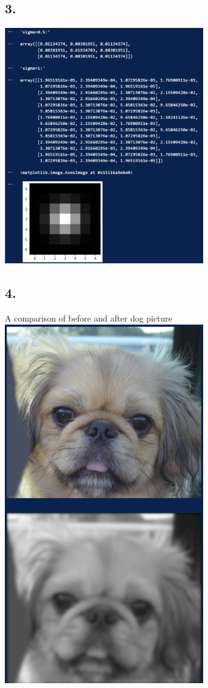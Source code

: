 \documentclass[12pt]{article}
\begin{document}
\subsection*{3.}
\includegraphics[width=0.65\textwidth]{imgs/3-1.png}
\subsection*{4.}
A comparison of before and after dog picture\\
\includegraphics[width=0.65\textwidth]{imgs/4-d.png}
\end{document}
